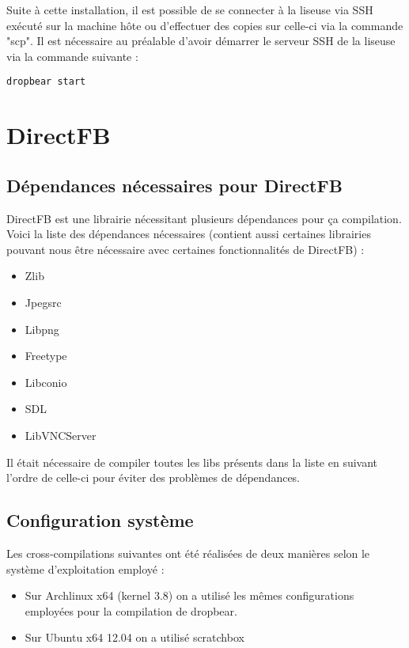 Suite à cette installation, il est possible de se connecter à la liseuse via SSH exécuté sur la machine hôte ou d'effectuer des copies sur celle-ci via la commande "scp". Il est nécessaire au préalable d'avoir démarrer le serveur SSH de la liseuse via la commande suivante :

\begin{lstlisting}
dropbear start
\end{lstlisting}

\newpage

\section{DirectFB}

\subsection{Dépendances nécessaires pour DirectFB}

DirectFB est une librairie nécessitant plusieurs dépendances pour ça compilation. Voici la liste des dépendances nécessaires (contient aussi certaines librairies pouvant nous être nécessaire avec certaines fonctionnalités de DirectFB) :

\begin{itemize}
\item Zlib
\item Jpegsrc
\item Libpng
\item Freetype
\item Libconio
\item SDL
\item LibVNCServer
\end{itemize}

Il était nécessaire de compiler toutes les libs présents dans la liste en suivant l'ordre de celle-ci pour éviter des problèmes de dépendances.

\subsection{Configuration système}
Les cross-compilations suivantes ont été réalisées de deux manières selon le système d'exploitation employé : 

\begin{itemize}
\item Sur Archlinux x64 (kernel 3.8) on a utilisé les mêmes configurations employées pour la compilation de dropbear.
\item Sur Ubuntu x64 12.04 on a utilisé scratchbox %
\end{itemize}

